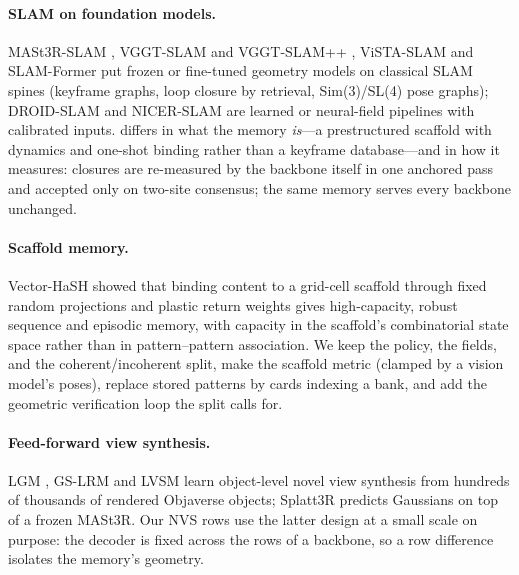 \paragraph{SLAM on foundation models.} MASt3R-SLAM \citep{mast3rslam},
VGGT-SLAM and VGGT-SLAM++ \citep{vggtslam,vggtslampp}, ViSTA-SLAM
\citep{vistaslam} and SLAM-Former \citep{slamformer} put frozen or fine-tuned
geometry models on classical SLAM spines (keyframe graphs, loop closure by
retrieval, Sim(3)/SL(4) pose graphs); DROID-SLAM \citep{droidslam} and
NICER-SLAM \citep{nicerslam} are learned or neural-field pipelines with
calibrated inputs. \smr{} differs in what the memory \emph{is}---a
prestructured scaffold with dynamics and one-shot binding rather than a
keyframe database---and in how it measures: closures are re-measured by the
backbone itself in one anchored pass and accepted only on two-site consensus;
the same memory serves every backbone unchanged.

\paragraph{Scaffold memory.} Vector-HaSH \citep{vectorhash} showed that
binding content to a grid-cell scaffold through fixed random projections and
plastic return weights gives high-capacity, robust sequence and episodic
memory, with capacity in the scaffold's combinatorial state space rather than
in pattern--pattern association. We keep the policy, the fields, and the
coherent/incoherent split, make the scaffold metric (clamped by a vision
model's poses), replace stored patterns by cards indexing a bank, and add the
geometric verification loop the split calls for.

\paragraph{Feed-forward view synthesis.} LGM \citep{lgm}, GS-LRM \citep{gslrm}
and LVSM \citep{lvsm} learn object-level novel view synthesis from hundreds of
thousands of rendered Objaverse objects; Splatt3R \citep{splatt3r} predicts
Gaussians on top of a frozen MASt3R. Our NVS rows use the latter design at a
small scale on purpose: the decoder is fixed across the rows of a backbone, so
a row difference isolates the memory's geometry.

